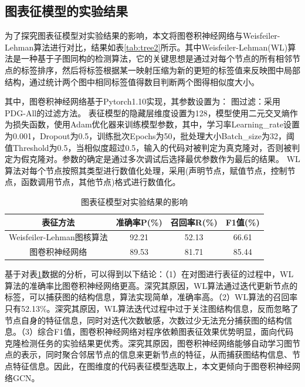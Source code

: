 \subsection{图表征模型的实验结果}
\label{subsec:PDGResult2}

为了探究图表征模型对实验结果的影响，本文将图卷积神经网络与Weisfeiler-Lehman算法进行对比，结果如表\ref{tab:tree2}所示。其中Weisfeiler-Lehman(WL)算法是一种基于子图同构的检测算法，它的关键思想是通过对每个节点的所有相邻节点的标签排序，然后将标签根据某一映射压缩为新的更短的标签值来反映图中局部结构，通过统计两个图中相同标签值得数目判断两个图得相似度大小\cite{articleWL}。

其中，图卷积神经网络基于Pytorch1.10实现，其参数设置为： 图过滤：采用PDG-All的过滤方法。 表征模型的隐藏层维度设置为128，模型使用二元交叉熵作为损失函数，使用Adam优化器来训练模型参数，其中，学习率Learning\_rate设置为0.001，Dropout为0.5，训练批次Epochs为50，批处理大小Batch\_size为32，阈值Threshold为0.5，当相似度超过0.5，输入的代码对被判定为真克隆对，否则被判定为假克隆对。参数的确定是通过多次调试后选择最优参数作为最后的结果。 WL算法对每个节点按照其类型进行数值化处理，采用(声明节点，赋值节点，控制节点，函数调用节点，其他节点)格式进行数值化。


\begin{table}[htp]  
  \centering  
  \caption{图表征模型对实验结果的影响}   
  \label{tab:graph2}
  \begin{tabular*}{0.9\textwidth}{@{\extracolsep{\fill}}cccc}  
  \toprule  
  表征方法 & 准确率P(\%) & 召回率R(\%) & F1值(\%)  \\  
  \midrule
  Weisfeiler-Lehman图核算法  & 92.21	  & 52.13	 & 66.61		\\  
  图卷积神经网络		         & 89.53		&81.71		&85.44\\ 
  \bottomrule  
  \end{tabular*}  
\end{table}

基于对表\ref{tab:graph2}数据的分析，可以得到以下结论：（1）在对图进行表征的过程中，WL算法的准确率比图卷积神经网络更高。深究其原因，WL算法通过迭代更新节点的标签，可以捕获图的结构信息，算法实现简单，准确率高。（2）WL算法的召回率只有52.13\%。深究其原因，WL算法迭代过程中过于关注图结构信息，反而忽略了节点自身的特征信息，同时对迭代次数敏感，次数过少无法充分捕获图的结构信息。（3）综合F1值，图卷积神经网络对程序依赖图表征效果优势明显，面向代码克隆检测任务的实验结果更优秀。深究其原因，图卷积神经网络能够自动学习图节点的表示，同时聚合邻居节点的信息来更新节点的特征，从而捕获图结构信息、节点特征信息。因此，在图维度的代码表征模型选取上，本文更倾向于图卷积神经网络GCN。

